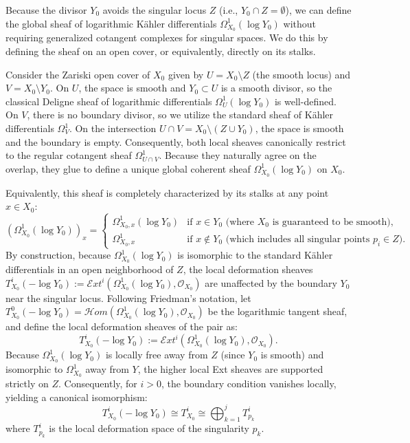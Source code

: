 \documentclass[10pt,a4paper]{amsart}
\newcommand{\OO}{\mathcal{O}}
\begin{document}
Because the divisor $Y_0$ avoids the singular locus $Z$ (i.e., $Y_0 \cap Z = \emptyset$), we can define the global sheaf of logarithmic K\"ahler differentials $\Omega_{X_0}^1(\log Y_0)$ without requiring generalized cotangent complexes for singular spaces. We do this by defining the sheaf on an open cover, or equivalently, directly on its stalks.

Consider the Zariski open cover of $X_0$ given by $U = X_0 \setminus Z$ (the smooth locus) and $V = X_0 \setminus Y_0$. 
On $U$, the space is smooth and $Y_0 \subset U$ is a smooth divisor, so the classical Deligne sheaf of logarithmic differentials $\Omega_U^1(\log Y_0)$ is well-defined. 
On $V$, there is no boundary divisor, so we utilize the standard sheaf of K\"ahler differentials $\Omega_V^1$. 
On the intersection $U \cap V = X_0 \setminus (Z \cup Y_0)$, the space is smooth and the boundary is empty. Consequently, both local sheaves canonically restrict to the regular cotangent sheaf $\Omega_{U \cap V}^1$. Because they naturally agree on the overlap, they glue to define a unique global coherent sheaf $\Omega_{X_0}^1(\log Y_0)$ on $X_0$.

Equivalently, this sheaf is completely characterized by its stalks at any point $x \in X_0$:
$$
\left( \Omega_{X_0}^1(\log Y_0) \right)_x = 
\begin{cases} 
\Omega_{X_0, x}^1(\log Y_0) & \text{if } x \in Y_0 \text{ (where } X_0 \text{ is guaranteed to be smooth)}, \\
\Omega_{X_0, x}^1 & \text{if } x \notin Y_0 \text{ (which includes all singular points } p_i \in Z).
\end{cases}
$$
By construction, because $\Omega_{X_0}^1(\log Y_0)$ is isomorphic to the standard K\"ahler differentials in an open neighborhood of $Z$, the local deformation sheaves $T_{X_0}^i(-\log Y_0) := \mathcal{E}xt^i(\Omega_{X_0}^1(\log Y_0), \OO_{X_0})$ are unaffected by the boundary $Y_0$ near the singular locus.
Following Friedman's notation, let $T_{X_0}^0(-\log Y_0) = \mathcal{H}om(\Omega_{X_0}^1(\log Y_0), \OO_{X_0})$ be the logarithmic tangent sheaf, and define the local deformation sheaves of the pair as:
\[
T_{X_0}^i(-\log Y_0) := \mathcal{E}xt^i(\Omega_{X_0}^1(\log Y_0), \OO_{X_0}).
\]
Because $\Omega_{X_0}^1(\log Y_0)$ is locally free away from $Z$ (since $Y_0$ is smooth) and isomorphic to $\Omega_{X_0}^1$ away from $Y$, the higher local Ext sheaves are supported strictly on $Z$. Consequently, for $i > 0$, the boundary condition vanishes locally, yielding a canonical isomorphism:
\[
T_{X_0}^i(-\log Y_0) \cong T_{X_0}^i \cong \bigoplus_{k=1}^j T_{p_k}^i
\]
where $T_{p_k}^i$ is the local deformation space of the singularity $p_k$.
\end{document}
